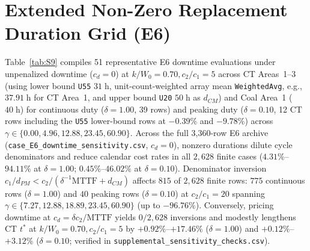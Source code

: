 \documentclass[10pt,a4paper]{article}
\begin{document}
\section{Extended Non-Zero Replacement Duration Grid (E6)}
\label{sec:S4}

Table~\ref{tab:S9} compiles 51 representative E6 downtime evaluations under unpenalized downtime ($c_d = 0$) at $k/W_0 = 0.70, c_2/c_1 = 5$ across CT Areas~1--3 (using lower bound \texttt{U55} $31\;\text{h}$, unit-count-weighted array mean \texttt{WeightedAvg}, e.g., $37.91\;\text{h}$ for CT Area~1, and upper bound \texttt{U20} $50\;\text{h}$ as $d_{CM}$) and Coal Area~1 ($40\;\text{h}$) for continuous duty ($\delta = 1.00$, 39 rows) and peaking duty ($\delta = 0.10$, 12 CT rows including the \texttt{U55} lower-bound rows at $-0.39\%$ and $-9.78\%$) across $\gamma \in \{0.00, 4.96, 12.88, 23.45, 60.90\}$. Across the full 3,360-row E6 archive (\texttt{case\_E6\_downtime\_sensitivity.csv}, $c_d = 0$), nonzero durations dilute cycle denominators and reduce calendar cost rates in all $2{,}628$ finite cases ($4.31\%$--$94.11\%$ at $\delta = 1.00$; $0.45\%$--$46.02\%$ at $\delta = 0.10$). Denominator inversion $c_1/d_{PM} < c_2/(\delta^{-1}\mathrm{MTTF} + d_{CM})$ affects $815$ of $2{,}628$ finite rows: $775$ continuous rows ($\delta = 1.00$) and $40$ peaking rows ($\delta = 0.10$) at $c_2/c_1 = 20$ spanning $\gamma \in \{7.27, 12.88, 18.89, 23.45, 60.90\}$ (up to $-96.76\%$). Conversely, pricing downtime at $c_d = \delta c_2 / \mathrm{MTTF}$ yields $0/2{,}628$ inversions and modestly lengthens CT $t^*$ at $k/W_0 = 0.70, c_2/c_1 = 5$ by $+0.92\%$--$+17.46\%$ ($\delta = 1.00$) and $+0.12\%$--$+3.12\%$ ($\delta = 0.10$; verified in \texttt{supplemental\_sensitivity\_checks.csv}).
\end{document}
